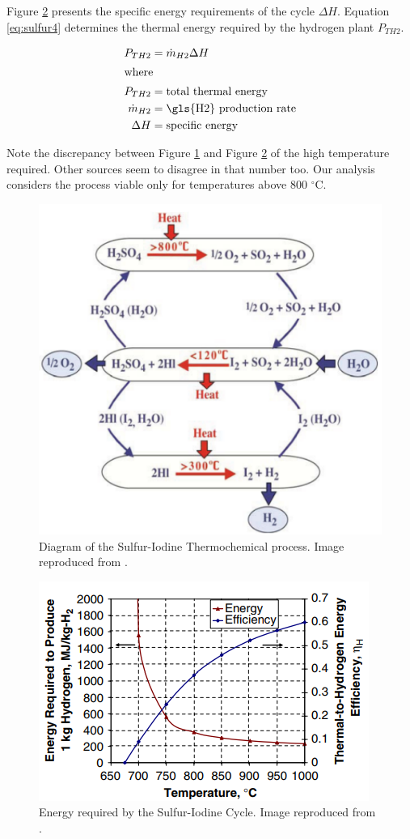 \documentclass[11pt,letterpaper]{article}
\begin{document}
Figure \ref{fig:sulfur2} presents the specific energy requirements of the cycle $\Delta H$.
Equation \ref{eq:sulfur4} determines the thermal energy required by the hydrogen plant $P_{TH2}$.

\begin{align}
	P_{TH2} &= \dot{m}_{H2} \Delta H\\
	\label{eq:sulfur4}
	\intertext{where}
	P_{TH2} &= \mbox{total thermal energy} \\
	\dot{m}_{H2} &= \mbox{\gls{H2} production rate} \\
	\Delta H &= \mbox{specific energy} \\
\end{align}

Note the discrepancy between Figure \ref{fig:sulfur1} and Figure \ref{fig:sulfur2} of the high temperature required.
Other sources seem to disagree in that number too.
Our analysis considers the process viable only for temperatures above 800 $^{\circ}$C.

\begin{figure}[htbp!]
	\centering
	\includegraphics[width=0.7\linewidth]{figures/sulfur1.png}
	\hfill
	\caption{Diagram of the Sulfur-Iodine Thermochemical process. Image reproduced from \cite{benjamin_russ_sulfur_2009}.}
	\label{fig:sulfur1}
\end{figure}

\begin{figure}[htbp!]
	\centering
	\includegraphics[width=0.7\linewidth]{figures/si-energy.png}
	\hfill
	\caption{Energy required by the Sulfur-Iodine Cycle. Image reproduced from \cite{yildiz_efficiency_2006}.}
	\label{fig:sulfur2}
\end{figure}
\end{document}
